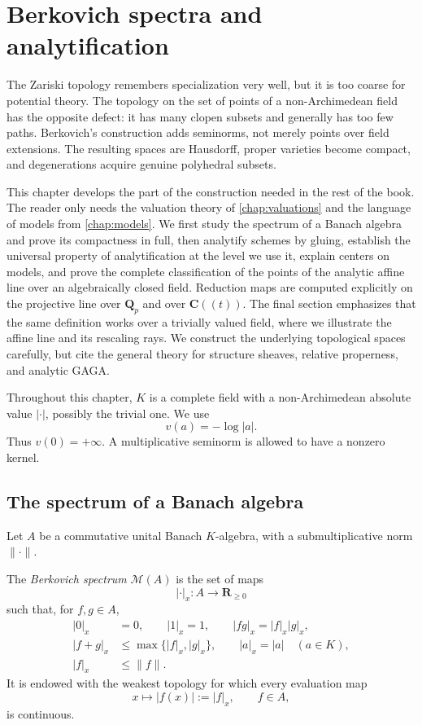 \chapter{Berkovich spectra and analytification}
\label{chap:berkovich}

The Zariski topology remembers specialization very well, but it is too coarse
for potential theory. The topology on the set of points of a non-Archimedean
field has the opposite defect: it has many clopen subsets and generally has
too few paths. Berkovich's construction adds seminorms, not merely points
over field extensions. The resulting spaces are Hausdorff, proper varieties
become compact, and degenerations acquire genuine polyhedral subsets.

This chapter develops the part of the construction needed in the rest of the
book. The reader only needs the valuation theory of \cref{chap:valuations}
and the language of models from \cref{chap:models}. We first study the
spectrum of a Banach algebra and prove its compactness in full,
then analytify schemes by gluing, establish the universal property of
analytification at the level we use it, explain centers on models, and
prove the complete classification of the points of the analytic affine
line over an algebraically closed field. Reduction maps are computed
explicitly on the projective line over $\mathbf Q_p$ and over
$\mathbf C(\!(t)\!)$. The final section emphasizes that the same
definition works over a trivially valued field, where we illustrate the
affine line and its rescaling rays. We construct the underlying
topological spaces carefully, but cite the general theory for structure
sheaves, relative properness, and analytic GAGA.

Throughout this chapter, $K$ is a complete field with a non-Archimedean
absolute value $|\cdot|$, possibly the trivial one. We use
\[
                         v(a)=-\log |a|.
\]
Thus $v(0)=+\infty$. A multiplicative seminorm is allowed to have a
nonzero kernel.

\section{The spectrum of a Banach algebra}
\label{sec:berk-spectrum}

Let $A$ be a commutative unital Banach $K$-algebra, with a
submultiplicative norm $\|\cdot\|$.

\begin{definition}\label{def:berk-spectrum}
The \emph{Berkovich spectrum} $\mathcal M(A)$ is the set of maps
\[
 |\cdot|_x:A\longrightarrow \mathbf R_{\geq 0}
\]
such that, for $f,g\in A$,
\[
\begin{split}
 |0|_x&=0,\qquad |1|_x=1,\qquad |fg|_x=|f|_x|g|_x,\\
 |f+g|_x&\leq\max\{|f|_x,|g|_x\},\qquad
 |a|_x=|a|\quad(a\in K),\\
 |f|_x&\leq\|f\|.
\end{split}
\]
It is endowed with the weakest topology for which every evaluation map
\[
       x\longmapsto |f(x)|:=|f|_x,\qquad f\in A,
\]
is continuous.
\end{definition}

